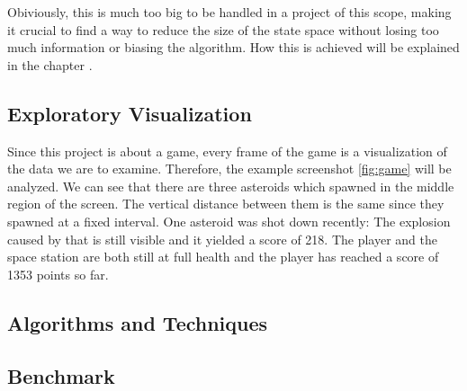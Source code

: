\documentclass[a4paper,10pt]{article}
\begin{document}
Obiviously, this is much too big to be handled in a project of this scope, making it crucial to find a way to reduce the size of the state space without losing too much information or biasing the algorithm.
How this is achieved will be explained in the chapter .


\subsection{Exploratory Visualization}

Since this project is about a game, every frame of the game is a visualization of the data we are to examine.
Therefore, the example screenshot \ref{fig:game} will be analyzed.
We can see that there are three asteroids which spawned in the middle region of the screen.
The vertical distance between them is the same since they spawned at a fixed interval.
One asteroid was shot down recently: The explosion caused by that is still visible and it yielded a score of 218.
The player and the space station are both still at full health and the player has reached a score of 1353 points so far.
\subsection{Algorithms and Techniques}



\subsection{Benchmark}
\end{document}
